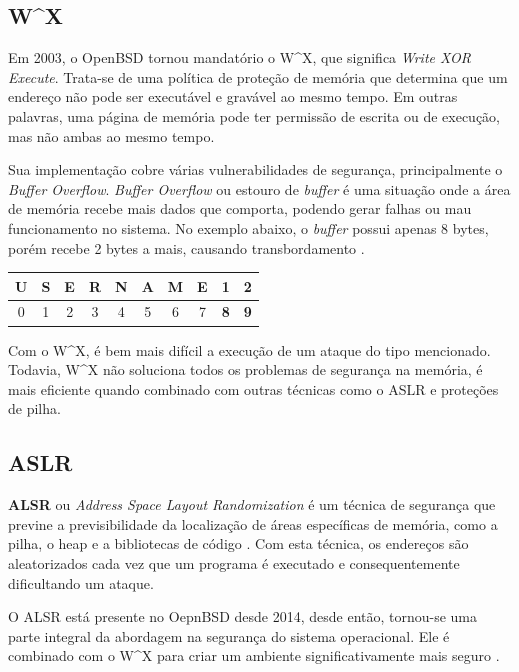 \documentclass[a4paper,10pt]{article}
\begin{document}
\subsection{W\^{}X}

Em 2003, o OpenBSD tornou mandatório o W\^{}X, que significa \textit{Write XOR Execute}. Trata-se de uma política de proteção de memória que determina que um endereço não pode ser executável e gravável ao mesmo tempo. Em outras palavras, uma página de memória pode ter permissão de escrita ou de execução, mas não ambas ao mesmo tempo.

Sua implementação cobre várias vulnerabilidades de segurança, principalmente o \textit{Buffer Overflow}. \textit{Buffer Overflow} ou estouro de \textit{buffer} é uma situação onde a área de memória recebe mais dados que comporta, podendo gerar falhas ou mau funcionamento no sistema. No exemplo abaixo, o \textit{buffer} possui apenas 8 bytes, porém recebe 2 bytes a mais, causando transbordamento \cite{de2010jitsec}.
\begin{center}
    \begin{tabular}{c c c c c c c c | c c}
         U & S & E & R & N & A & M & E & \textbf{1} & \textbf{2} \\
         \hline
         0 & 1 & 2 & 3 & 4 & 5 & 6 & 7 & \textbf{8} & \textbf{9} \\
    \end{tabular}
\end{center}

Com o W\^{}X, é bem mais difícil a execução de um ataque do tipo mencionado. Todavia, W\^{}X não soluciona todos os problemas de segurança na memória, é mais eficiente quando combinado com outras técnicas como o ASLR e proteções de pilha.

\subsection{ASLR}

\textbf{ALSR} ou \textit{Address Space Layout Randomization} é um técnica de segurança que previne a previsibilidade da localização de áreas específicas de memória, como a pilha, o heap e a bibliotecas de código \cite{hartmeier2002design}. Com esta técnica, os endereços são aleatorizados cada vez que um programa é executado e consequentemente dificultando um ataque.

O ALSR está presente no OepnBSD desde 2014, desde então, tornou-se uma parte integral da abordagem na segurança do sistema operacional. Ele é combinado com o W\^{}X para criar um ambiente significativamente mais seguro \cite{marco2019address}.
\end{document}
